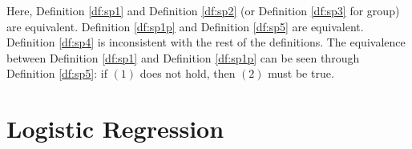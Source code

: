 \documentclass{article}
\begin{document}
Here, Definition \ref{df:sp1} and Definition \ref{df:sp2} (or Definition \ref{df:sp3} for group) are equivalent. Definition \ref{df:sp1p} and Definition \ref{df:sp5} are equivalent. Definition \ref{df:sp4} is inconsistent with the rest of the definitions.
\newline \newline
The equivalence between Definition \ref{df:sp1} and Definition \ref{df:sp1p} can be seen through Definition \ref{df:sp5}: if $\left(1\right)$ does not hold, then $\left(2\right)$ must be true.
\newline \newline



\section{Logistic Regression} 
\end{document}
